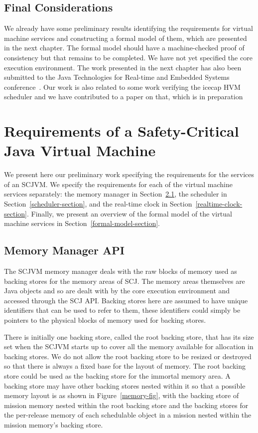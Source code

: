 \documentclass[a4paper,10pt]{report}
\begin{document}
\section{Final Considerations}

We already have some preliminary results identifying the requirements for
virtual machine services and constructing a formal model of them, which are
presented in the next chapter.  The formal model should have a machine-checked
proof of consistency but that remains to be completed.  We have not yet
specified the core execution environment.  The work presented in the next
chapter has also been submitted to the Java Technologies for Real-time and
Embedded Systems conference~\cite{baxter2015submitted}.  Our work is also
related to some work verifying the icecap HVM scheduler and we have contributed
to a paper on that, which is in preparation~\cite{freitas2015inpreparation}

\chapter{Requirements of a Safety-Critical Java Virtual Machine}
\label{requirements-chapter}

We present here our preliminary work specifying the requirements for the
services of an SCJVM.  We specify the requirements for each of the virtual
machine services separately: the memory manager in
Section~\ref{memory-manager-section}, the scheduler in
Section~\ref{scheduler-section}, and the real-time clock in
Section~\ref{realtime-clock-section}.  Finally, we present an overview of the
formal model of the virtual machine services in
Section~\ref{formal-model-section}.

\section{Memory Manager API}
\label{memory-manager-section}

The SCJVM memory manager deals with the raw blocks of memory used as backing
stores for the memory areas of SCJ. The memory areas themselves are Java objects
and so are dealt with by the core execution environment and accessed through the
SCJ API. Backing stores here are assumed to have unique identifiers that can be
used to refer to them, these identifiers could simply be pointers to the
physical blocks of memory used for backing stores.

There is initially one backing store, called the root backing store, that has
its size set when the SCJVM starts up to cover all the memory available for
allocation in backing stores. We do not allow the root backing store to be
resized or destroyed so that there is always a fixed base for the layout of 
memory. The root backing store could be used as the backing store for the
immortal memory area. A backing store may have other backing stores nested
within it so that a possible memory layout is as shown in 
Figure~\ref{memory-fig}, with the backing store of mission memory nested within
the root backing store and the backing stores for the per-release memory of each
schedulable object in a mission nested within the mission memory's backing
store.
\end{document}
